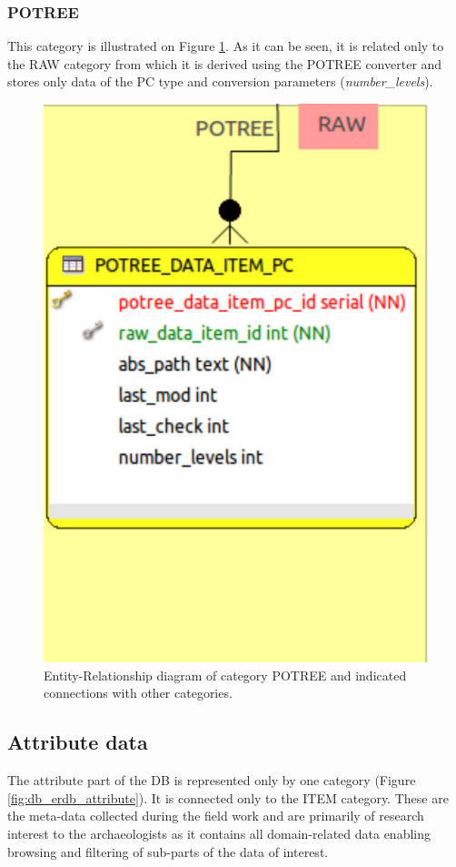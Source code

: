 \subsubsection{POTREE}
This category is illustrated on Figure \ref{fig:db_erdb_potree}. As it can be seen, it is related only to the RAW category from which it is derived using the POTREE converter and stores only data of the PC type and conversion parameters ({\em number_levels}).
\begin{figure}[!H]
\centering
\includegraphics[scale=0.35]{fig/database/ERDB_POTREE_conn.pdf}
\caption{Entity-Relationship diagram of category POTREE and indicated connections with other categories.}
\label{fig:db_erdb_potree}
\end{figure}

\subsection{Attribute data}
The attribute part of the DB is represented only by one category (Figure \ref{fig:db_erdb_attribute}). It  is connected only to the ITEM category. These are the meta-data collected during the field work and are primarily of research interest to the archaeologists as it contains all domain-related data enabling browsing and filtering of sub-parts of the data of interest.

